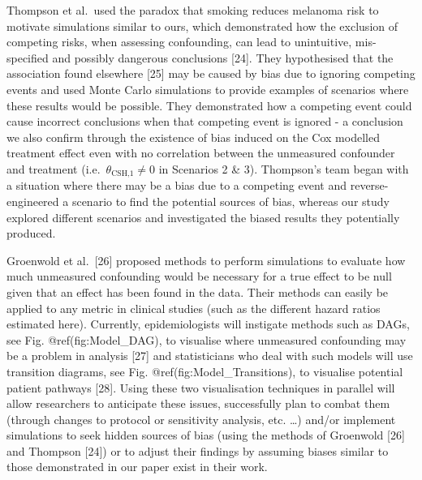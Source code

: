 \documentclass[12pt,PhD,twoside,openright]{muthesis}
\begin{document}
Thompson et al.~used the paradox that smoking reduces melanoma risk to motivate simulations similar to ours, which demonstrated how the exclusion of competing risks, when assessing confounding, can lead to unintuitive, mis-specified and possibly dangerous conclusions {[}24{]}. They hypothesised that the association found elsewhere {[}25{]} may be caused by bias due to ignoring competing events and used Monte Carlo simulations to provide examples of scenarios where these results would be possible. They demonstrated how a competing event could cause incorrect conclusions when that competing event is ignored - a conclusion we also confirm through the existence of bias induced on the Cox modelled treatment effect even with no correlation between the unmeasured confounder and treatment (i.e.~\(\theta_{\textrm{CSH,1}} \neq 0\) in Scenarios 2 \& 3). Thompson's team began with a situation where there may be a bias due to a competing event and reverse-engineered a scenario to find the potential sources of bias, whereas our study explored different scenarios and investigated the biased results they potentially produced.

Groenwold et al.~{[}26{]} proposed methods to perform simulations to evaluate how much unmeasured confounding would be necessary for a true effect to be null given that an effect has been found in the data. Their methods can easily be applied to any metric in clinical studies (such as the different hazard ratios estimated here). Currently, epidemiologists will instigate methods such as DAGs, see Fig. @ref(fig:Model\_DAG), to visualise where unmeasured confounding may be a problem in analysis {[}27{]} and statisticians who deal with such models will use transition diagrams, see Fig. @ref(fig:Model\_Transitions), to visualise potential patient pathways {[}28{]}. Using these two visualisation techniques in parallel will allow researchers to anticipate these issues, successfully plan to combat them (through changes to protocol or sensitivity analysis, etc. \ldots) and/or implement simulations to seek hidden sources of bias (using the methods of Groenwold {[}26{]} and Thompson {[}24{]}) or to adjust their findings by assuming biases similar to those demonstrated in our paper exist in their work.
\end{document}
